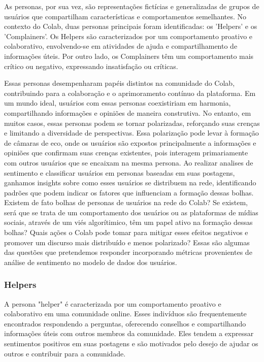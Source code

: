 As personas, por sua vez, são representações fictícias e generalizadas de grupos de usuários que compartilham características e comportamentos semelhantes. No contexto do Colab, duas personas principais foram identificadas: os 'Helpers' e os 'Complainers'. Os Helpers são caracterizados por um comportamento proativo e colaborativo, envolvendo-se em atividades de ajuda e compartilhamento de informações úteis. Por outro lado, os Complainers têm um comportamento mais crítico ou negativo, expressando insatisfação ou críticas.

Essas personas desempenharam papéis distintos na comunidade do Colab, contribuindo para a colaboração e o aprimoramento contínuo da plataforma. Em um mundo ideal, usuários com essas personas coexistiriam em harmonia, compartilhando informações e opiniões de maneira construtiva. No entanto, em muitos casos, essas personas podem se tornar polarizadas, reforçando suas crenças e limitando a diversidade de perspectivas. Essa polarização pode levar à formação de câmaras de eco, onde os usuários são expostos principalmente a informações e opiniões que confirmam suas crenças existentes, pois interagem primariamente com outros usuários que se encaixam na mesma persona. Ao realizar analises de sentimento e classificar usuários em personas baseadas em suas postagens, ganhamos insights sobre como esses usuários se distribuem na rede, identificando padrões que podem indicar os fatores que influenciam a formação dessas bolhas. Existem de fato bolhas de personas de usuários na rede do Colab? Se existem, será que se trata de um comportamento dos usuários ou as plataformas de mídias sociais, através de um viés algorítimico, têm um papel ativo na formação dessas bolhas? Quais ações o Colab pode tomar para mitigar esses efeitos negativos e promover um discurso mais distribuído e menos polarizado? Essas são algumas das questões que pretendemos responder incorporando métricas provenientes de análise de sentimento no modelo de dados dos usuários.

\subsubsection*{Helpers}

A persona "helper" é caracterizada por um comportamento proativo e colaborativo em uma comunidade online. Esses indivíduos são frequentemente encontrados respondendo a perguntas, oferecendo conselhos e compartilhando informações úteis com outros membros da comunidade. Eles tendem a expressar sentimentos positivos em suas postagens e são motivados pelo desejo de ajudar os outros e contribuir para a comunidade.

